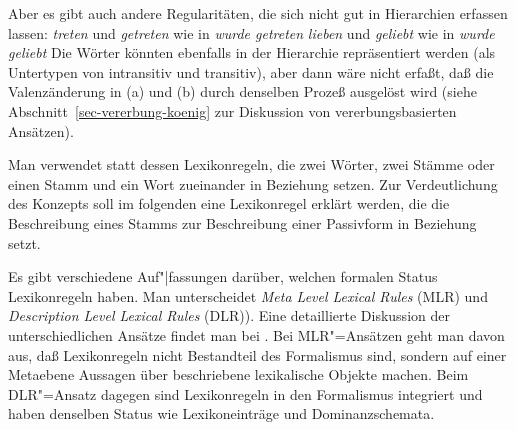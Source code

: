 Aber es gibt auch andere Regularitäten, die sich nicht gut in Hierarchien erfassen lassen:
\eal
\ex \emph{treten} und \emph{getreten} wie in \emph{wurde getreten}
\ex \emph{lieben} und \emph{geliebt}  wie in \emph{wurde geliebt}
\zl
Die Wörter könnten ebenfalls in der Hierarchie repräsentiert werden (als Untertypen von intransitiv und transitiv),
aber dann wäre nicht erfaßt, daß die Valenzänderung in (a) und (b) durch denselben Prozeß
ausgelöst wird (siehe Abschnitt~\ref{sec-vererbung-koenig} zur Diskussion von vererbungsbasierten Ansätzen).

Man verwendet statt dessen Lexikonregeln, die zwei Wörter, zwei Stämme oder einen Stamm und ein
Wort zueinander in Beziehung setzen. 
Zur Verdeutlichung des Konzepts soll im folgenden eine Lexikonregel erklärt werden,
die die Beschreibung eines Stamms zur Beschreibung einer Passivform in Beziehung setzt.

Es gibt verschiedene Auf"|fassungen darüber, welchen formalen Status Lexikonregeln haben.
Man unterscheidet \emph{Meta Level Lexical Rules} (MLR) und \emph{Description Level Lexical Rules} (DLR)).
Eine detaillierte Diskussion der unterschiedlichen Ansätze findet man bei .
Bei MLR"=Ansätzen geht man davon aus, daß Lexikonregeln nicht Bestandteil des Formalismus sind,
sondern auf einer Metaebene Aussagen über beschriebene lexikalische Objekte machen. Beim
DLR"=Ansatz dagegen sind Lexikonregeln in den Formalismus integriert und haben denselben
Status wie Lexikoneinträge und Dominanzschemata.




